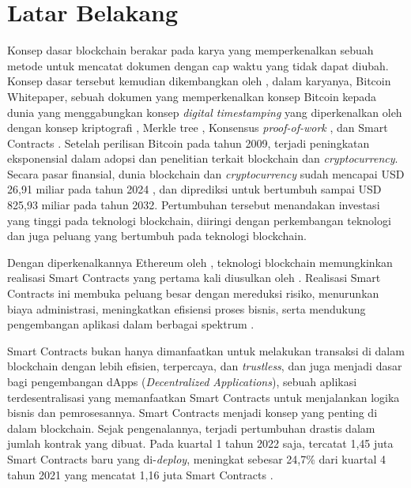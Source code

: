 \section{Latar Belakang}
\label{sec:latarbelakang}

Konsep dasar blockchain berakar pada karya \cite{haber1991time} yang memperkenalkan sebuah metode untuk mencatat dokumen dengan cap waktu yang tidak dapat diubah. Konsep dasar tersebut kemudian dikembangkan oleh \cite{nakamoto2008bitcoin}, dalam karyanya, Bitcoin Whitepaper, sebuah dokumen yang memperkenalkan konsep Bitcoin kepada dunia yang menggabungkan konsep \textit{digital timestamping} yang diperkenalkan oleh \cite{haber1991time} dengan konsep kriptografi \parencite{hellman1976new} \parencite{standard1995secure}, Merkle tree \parencite{merkle1987digital}, Konsensus \textit{proof-of-work} \parencite{dwork1992pricing}, dan Smart Contracts \parencite{szabo1997formalizing}. Setelah perilisan Bitcoin pada tahun 2009, terjadi peningkatan eksponensial dalam adopsi dan penelitian terkait blockchain dan \textit{cryptocurrency}. Secara pasar finansial, dunia blockchain dan \textit{cryptocurrency} sudah mencapai USD 26,91 miliar pada tahun 2024 \parencite{rosencrance2024top}, dan diprediksi untuk bertumbuh sampai USD 825,93 miliar pada tahun 2032. Pertumbuhan tersebut menandakan investasi yang tinggi pada teknologi blockchain, diiringi dengan perkembangan teknologi dan juga peluang yang bertumbuh pada teknologi blockchain.

Dengan diperkenalkannya Ethereum oleh \cite{buterin2013ethereum}, teknologi blockchain memungkinkan realisasi Smart Contracts yang pertama kali diusulkan oleh \cite{szabo1997formalizing}. Realisasi Smart Contracts ini membuka peluang besar dengan mereduksi risiko, menurunkan biaya administrasi, meningkatkan efisiensi proses bisnis, serta mendukung pengembangan aplikasi dalam berbagai spektrum \parencite{zheng2020overview}.

Smart Contracts bukan hanya dimanfaatkan untuk melakukan transaksi di dalam blockchain dengan lebih efisien, terpercaya, dan \textit{trustless}, dan juga menjadi dasar bagi pengembangan dApps (\textit{Decentralized Applications}), sebuah aplikasi terdesentralisasi yang memanfaatkan Smart Contracts untuk menjalankan logika bisnis dan pemrosesannya. Smart Contracts menjadi konsep yang penting di dalam blockchain. Sejak pengenalannya, terjadi pertumbuhan drastis dalam jumlah kontrak yang dibuat. Pada kuartal 1 tahun 2022 saja, tercatat 1,45 juta Smart Contracts baru yang di-\textit{deploy}, meningkat sebesar 24,7\% dari kuartal 4 tahun 2021 yang mencatat 1,16 juta Smart Contracts \parencite{alchemy_ethereum_statistics}.

